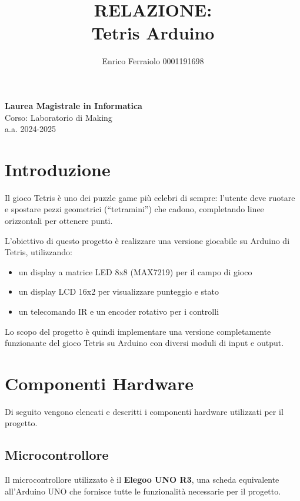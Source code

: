 \documentclass[a4paper, 12pt]{article}
\title{\textbf{RELAZIONE: \\ Tetris Arduino}}
\author{Enrico Ferraiolo 0001191698}
\date{}
\begin{document}
\maketitle

\begin{center}
    \textbf{Laurea Magistrale in Informatica}\\
    \vspace{0.3cm}
    Corso: Laboratorio di Making\\
    a.a. 2024-2025
    \vspace{2cm}
\end{center}

\newpage

\tableofcontents
\newpage

\section{Introduzione}
\label{sec:introduzione}
Il gioco Tetris è uno dei puzzle game più celebri di sempre: l'utente deve ruotare e spostare pezzi geometrici (``tetramini'') che cadono,
completando linee orizzontali per ottenere punti.

L'obiettivo di questo progetto è realizzare una versione giocabile su Arduino di Tetris, utilizzando:
\begin{itemize}
    \item un display a matrice LED 8x8 (MAX7219) per il campo di gioco
    \item un display LCD 16x2 per visualizzare punteggio e stato
    \item un telecomando IR e un encoder rotativo per i controlli
\end{itemize}

Lo scopo del progetto è quindi implementare una versione completamente funzionante del gioco Tetris su Arduino con diversi moduli di input e output.

\section{Componenti Hardware}
\label{sec:componenti-hardware}
Di seguito vengono elencati e descritti i componenti hardware utilizzati per il progetto.

\subsection{Microcontrollore}
\label{subsec:microcontrollore}
Il microcontrollore utilizzato è il \textbf{Elegoo UNO R3}, una scheda equivalente all'Arduino UNO che fornisce tutte le funzionalità necessarie per il progetto.
\end{document}
